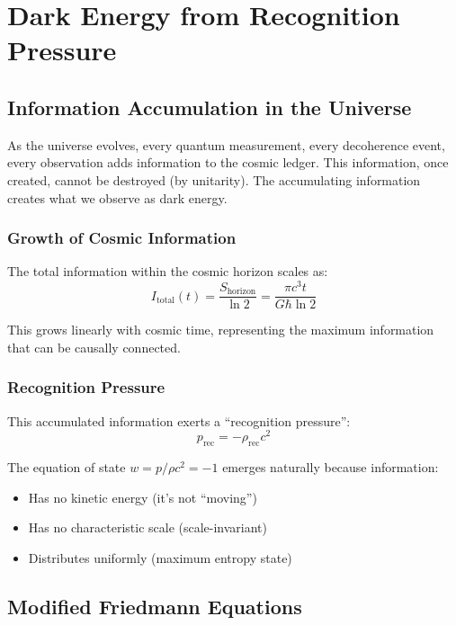 \documentclass[12pt,letterpaper]{article}
\begin{document}
\newpage

\section{Dark Energy from Recognition Pressure}

\subsection{Information Accumulation in the Universe}

As the universe evolves, every quantum measurement, every decoherence event, every observation adds information to the cosmic ledger. This information, once created, cannot be destroyed (by unitarity). The accumulating information creates what we observe as dark energy.

\subsubsection{Growth of Cosmic Information}

The total information within the cosmic horizon scales as:
\begin{equation}
I_{\text{total}}(t) = \frac{S_{\text{horizon}}}{\ln 2} = \frac{\pi c^3 t}{G\hbar \ln 2}
\end{equation}

This grows linearly with cosmic time, representing the maximum information that can be causally connected.

\subsubsection{Recognition Pressure}

This accumulated information exerts a ``recognition pressure'':
\begin{equation}
p_{\text{rec}} = -\rho_{\text{rec}} c^2
\end{equation}

The equation of state $w = p/\rho c^2 = -1$ emerges naturally because information:
\begin{itemize}
    \item Has no kinetic energy (it's not ``moving'')
    \item Has no characteristic scale (scale-invariant)
    \item Distributes uniformly (maximum entropy state)
\end{itemize}

\subsection{Modified Friedmann Equations}
\end{document}
